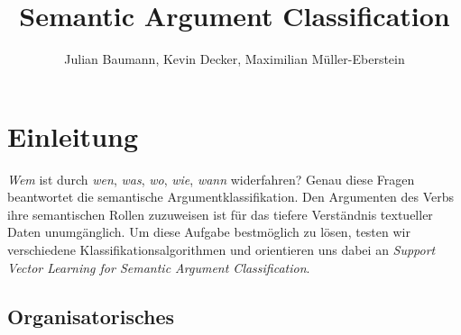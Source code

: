 \documentclass[runningheads]{llncs}
\begin{document}
\lstset{language=Python}

\title{Semantic Argument Classification}

\author{Julian Baumann, Kevin Decker, Maximilian M\"uller-Eberstein}


\maketitle

\section{Einleitung}
\textit{Wem} ist durch \textit{wen}, \textit{was}, \textit{wo}, \textit{wie}, \textit{wann} widerfahren? Genau diese Fragen beantwortet die semantische Argumentklassifikation. Den Argumenten des Verbs ihre semantischen Rollen zuzuweisen ist f\"ur das tiefere Verst\"andnis textueller Daten unumg\"anglich. Um diese Aufgabe bestm\"oglich zu l\"osen, testen wir verschiedene Klassifikationsalgorithmen und orientieren uns dabei an \textit{Support Vector Learning for Semantic Argument Classiﬁcation}\cite{svm}.
\subsection{Organisatorisches}
\begin{gantt}{13}{10}
    \begin{ganttitle}
    \end{ganttitle}
    \begin{ganttitle}
    \end{ganttitle}
\end{gantt}
\end{document}
